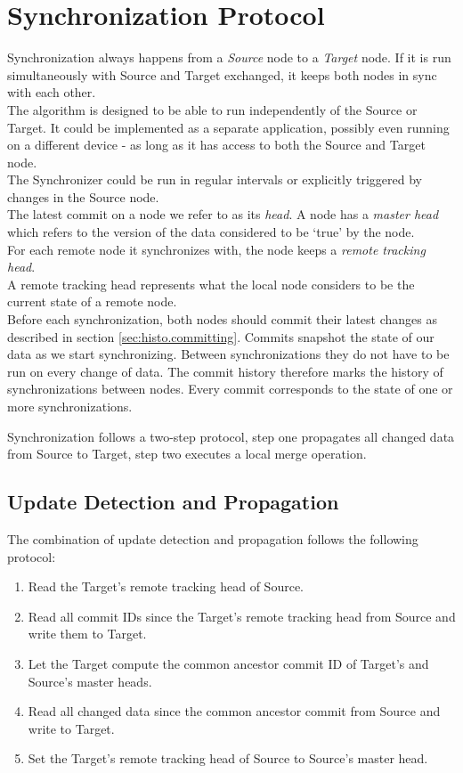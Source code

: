 
\section{Synchronization Protocol}
\label{sec:histo.protocol}
Synchronization always happens from a \emph{Source} node to a \emph{Target} node.
If it is run simultaneously with Source and Target exchanged, it keeps both nodes in sync with each other.\\
The algorithm is designed to be able to run independently of the Source or Target.
It could be implemented as a separate application, possibly even running on a different device - as long as it has access to both the Source and Target node.\\
The Synchronizer could be run in regular intervals or explicitly triggered by changes in the Source node.\\

The latest commit on a node we refer to as its \emph{head}.
A node has a \emph{master head} which refers to the version of the data considered to be `true' by the node.\\
For each remote node it synchronizes with, the node keeps a \emph{remote tracking head}.\\
A remote tracking head represents what the local node considers to be the current state of a remote node.\\
Before each synchronization, both nodes should commit their latest changes as described in section \ref{sec:histo.committing}.
Commits snapshot the state of our data as we start synchronizing.
Between synchronizations they do not have to be run on every change of data.
The commit history therefore marks the history of synchronizations between nodes.
Every commit corresponds to the state of one or more synchronizations.

Synchronization follows a two-step protocol, step one propagates all changed data from Source to Target, step two executes a local merge operation.

\subsection{Update Detection and Propagation}
\label{sec:histo.protocol.detection-propagation}
The combination of update detection and propagation follows the following protocol:

\begin{enumerate}
\item Read the Target's remote tracking head of Source.
\item Read all commit IDs since the Target's remote tracking head from Source and write them to Target.
\item Let the Target compute the common ancestor commit ID of Target's and Source's master heads.
\item Read all changed data since the common ancestor commit from Source and write to Target.
\item Set the Target's remote tracking head of Source to Source's master head.
\end{enumerate}

